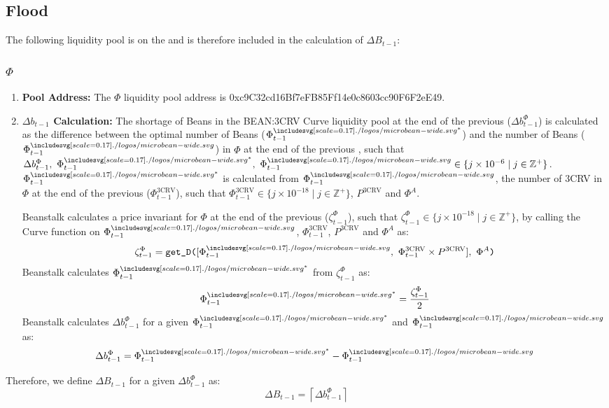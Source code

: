 \documentclass[class=article, crop=false]{standalone}
\begin{document}
\subsection{Flood}
The following liquidity pool is on the   and is therefore included in the calculation of $\Delta B_{t-1}$:
\subsubsection{$\Phi$}
    \begin{enumerate}
        \item \textbf{Pool Address:} The $\Phi$ liquidity pool address is 0xc9C32cd16Bf7eFB85Ff14e0c8603cc90F6F2eE49.
        \item \textbf{$\Delta b_{t-1}$ Calculation:} The shortage of Beans in the BEAN:3CRV Curve liquidity pool at the end of the previous  ($\Delta b_{t-1}^{\Phi}$) is calculated as the difference between the optimal number of Beans ($\Phi_{t-1}^{{\bean}^*}$) and the number of Beans ($\Phi_{t-1}^{\bean}$) in $\Phi$ at the end of the previous , such that $\Delta b_{t-1}^{\Phi},\ \Phi_{t-1}^{{\bean}^*},\ \Phi_{t-1}^{\bean} \in \{j \times 10^{-6} \mid j \in \mathbb{Z}^{+} \}$. $\Phi_{t-1}^{{\bean}^*}$ is calculated from $\Phi_{t-1}^{\bean}$, the number of 3CRV in $\Phi$ at the end of the previous  ($\Phi_{t-1}^{\text{3CRV}}$), such that $\Phi_{t-1}^{\text{3CRV}}\in \{j \times 10^{-18} \mid j \in \mathbb{Z}^{+} \}$, $P^{\text{3CRV}}$ and $\Phi^{A}$. 

Beanstalk calculates a price invariant for $\Phi$ at the end of the previous  ($\zeta^{\Phi}_{t-1}$), such that $\zeta^{\Phi}_{t-1}\in \{j \times 10^{-18} \mid j \in \mathbb{Z}^{+} \}$, by calling the Curve  function on $\Phi_{t-1}^{\bean}$, $\Phi_{t-1}^{\text{3CRV}}$, $P^{\text{3CRV}}$ and $\Phi^{A}$ as:
$$\zeta^{\Phi}_{t-1} = \code{get\_D(}[\Phi_{t-1}^{\bean},\ \Phi_{t-1}^{\text{3CRV}} \times P^{\text{3CRV}}],\ \Phi^{A}\code{)}$$
Beanstalk calculates $\Phi_{t-1}^{{\bean}^*}$ from $\zeta^{\Phi}_{t-1}$ as:
$$\Phi_{t-1}^{{\bean}^*} = \frac{\zeta^{\Phi}_{t-1}}{2}$$
Beanstalk calculates $\Delta b_{t-1}^{\Phi}$ for a given $\Phi_{t-1}^{{\bean}^*}$ and $\Phi_{t-1}^{\bean}$ as:
$$\Delta b_{t-1}^{\Phi} = \Phi_{t-1}^{{\bean}^*} - \Phi_{t-1}^{\bean}$$
    \end{enumerate}

Therefore, we define $\Delta B_{t-1}$ for a given $\Delta b_{t-1}^{\Phi}$ as:
$$\Delta B_{t-1} = \left\lceil\Delta b_{t-1}^{\Phi}\right\rceil$$
\end{document}
